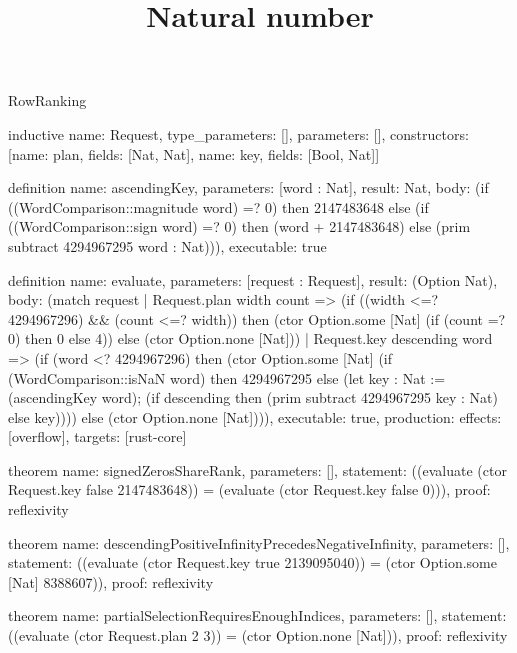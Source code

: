 \begin{lexlean}{RowRanking}
\title{Natural number}
\begin{semanticmodule}
inductive{
  name: Request,
  type_parameters: [],
  parameters: [],
  constructors: [{name: plan, fields: [Nat, Nat]}, {name: key, fields: [Bool, Nat]}]
}

definition{
  name: ascendingKey,
  parameters: [word : Nat],
  result: Nat,
  body: (if ((WordComparison::magnitude word) =? 0) then 2147483648 else (if ((WordComparison::sign word) =? 0) then (word + 2147483648) else (prim subtract 4294967295 word : Nat))),
  executable: true
}

definition{
  name: evaluate,
  parameters: [request : Request],
  result: (Option Nat),
  body: (match request
    | Request.plan width count => (if ((width <=? 4294967296) && (count <=? width)) then (ctor Option.some [Nat] (if (count =? 0) then 0 else 4)) else (ctor Option.none [Nat]))
    | Request.key descending word => (if (word <? 4294967296) then (ctor Option.some [Nat] (if (WordComparison::isNaN word) then 4294967295 else (let key : Nat := (ascendingKey word); (if descending then (prim subtract 4294967295 key : Nat) else key)))) else (ctor Option.none [Nat]))),
  executable: true,
  production: {effects: [overflow], targets: [rust-core]}
}

theorem{
  name: signedZerosShareRank,
  parameters: [],
  statement: ((evaluate (ctor Request.key false 2147483648)) = (evaluate (ctor Request.key false 0))),
  proof: reflexivity{}
}

theorem{
  name: descendingPositiveInfinityPrecedesNegativeInfinity,
  parameters: [],
  statement: ((evaluate (ctor Request.key true 2139095040)) = (ctor Option.some [Nat] 8388607)),
  proof: reflexivity{}
}

theorem{
  name: partialSelectionRequiresEnoughIndices,
  parameters: [],
  statement: ((evaluate (ctor Request.plan 2 3)) = (ctor Option.none [Nat])),
  proof: reflexivity{}
}
\end{semanticmodule}
\end{lexlean}
